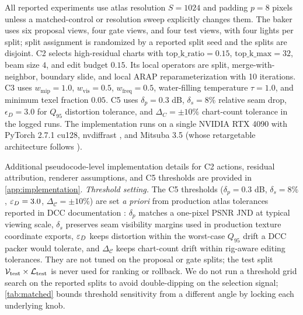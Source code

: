 All reported experiments use atlas resolution \(S=1024\) and padding \(p=8\) pixels unless a matched-control or resolution sweep explicitly changes them. The baker uses six proposal views, four gate views, and four test views, with four lights per split; split assignment is randomized by a reported split seed and the splits are disjoint. C2 selects high-residual charts with \(\mathrm{top\_k\_ratio}=0.15\), \(\mathrm{top\_k\_max}=32\), beam size \(4\), and edit budget \(0.15\). Its local operators are split, merge-with-neighbor, boundary slide, and local ARAP reparameterization with 10 iterations. C3 uses \(w_{\mathrm{mip}}=1.0\), \(w_{\mathrm{vis}}=0.5\), \(w_{\mathrm{freq}}=0.5\), water-filling temperature \(\tau=1.0\), and minimum texel fraction \(0.05\). C5 uses \(\delta_p=0.3\) dB, \(\delta_s=8\%\) relative seam drop, \(\epsilon_D=3.0\) for \(Q_{95}\) distortion tolerance, and \(\Delta_C=\pm 10\%\) chart-count tolerance in the logged runs. The implementation runs on a single NVIDIA RTX 4090 with PyTorch 2.7.1 cu128, nvdiffrast \cite{laine2020_nvdiffrast_modular_primitives}, and Mitsuba 3.5 \cite{jakob2022mitsuba3} (whose retargetable architecture follows \cite{nimier_david2019_mitsuba2}).

Additional pseudocode-level implementation details for C2 actions, residual attribution, renderer assumptions, and C5 thresholds are provided in \cref{app:implementation}. \emph{Threshold setting.} The C5 thresholds (\(\delta_p=0.3\) dB, \(\delta_s=8\%\), \(\varepsilon_D=3.0\), \(\Delta_\mathcal{C}=\pm 10\%\)) are set \emph{a priori} from production atlas tolerances reported in DCC documentation \cite{young2024_xatlas,blender2026_smart_uv_project,autodesk2026_maya_uv_editor,maxon2026_zbrush_uv_master}: \(\delta_p\) matches a one-pixel PSNR JND at typical viewing scale, \(\delta_s\) preserves seam visibility margins used in production texture coordinate exports, \(\varepsilon_D\) keeps distortion within the worst-case \(Q_{95}\) drift a DCC packer would tolerate, and \(\Delta_\mathcal{C}\) keeps chart-count drift within rig-aware editing tolerances. They are not tuned on the proposal or gate splits; the test split \(\mathcal{V}_{\mathrm{test}}\times\mathcal{L}_{\mathrm{test}}\) is never used for ranking or rollback. We do not run a threshold grid search on the reported splits to avoid double-dipping on the selection signal; \cref{tab:matched} bounds threshold sensitivity from a different angle by locking each underlying knob.

